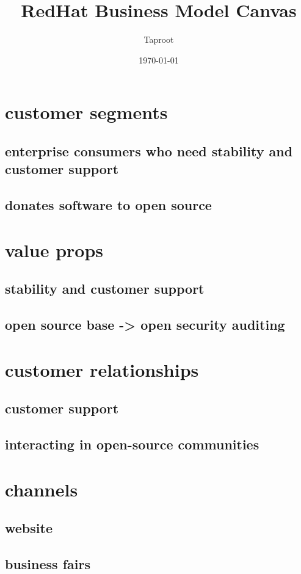 \documentclass[letterpaper]{article}
\author{Taproot}
\date{\today}
\title{RedHat Business Model Canvas}
\renewcommand{\tableofcontents}{}
\begin{document}
\tableofcontents

\section{customer segments}
\label{sec:org1533ea6}
\subsection{enterprise consumers who need stability and customer support}
\label{sec:orgcf5e38a}
\subsection{donates software to open source}
\label{sec:org201f13a}
\section{value props}
\label{sec:org241ffbd}
\subsection{stability and customer support}
\label{sec:org5de5da3}
\subsection{open source base -> open security auditing}
\label{sec:org5d2eae7}
\section{customer relationships}
\label{sec:org2b300e7}
\subsection{customer support}
\label{sec:org2556a33}
\subsection{interacting in open-source communities}
\label{sec:orgd90527e}
\section{channels}
\label{sec:orgd34ab3f}
\subsection{website}
\label{sec:org2274628}
\subsection{business fairs}
\label{sec:org52a036f}
\end{document}
